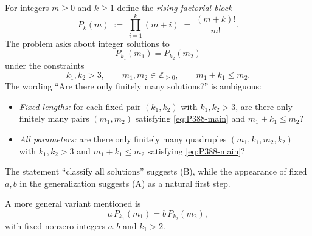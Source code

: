 For integers $m\ge 0$ and $k\ge 1$ define the \emph{rising factorial block}
\[
P_k(m) \;:=\; \prod_{i=1}^{k}(m+i) \;=\; \frac{(m+k)!}{m!}.
\]
The problem asks about integer solutions to
\begin{equation}
\label{eq:P388-main}
P_{k_1}(m_1)=P_{k_2}(m_2)
\end{equation}
under the constraints
\[
 k_1,k_2>3,\qquad m_1,m_2\in\mathbb Z_{\ge 0},\qquad m_1+k_1\le m_2.
\]
The wording ``Are there only finitely many solutions?'' is ambiguous:
\begin{itemize}[leftmargin=2em]
\item[(A)] \emph{Fixed lengths:} for each fixed pair $(k_1,k_2)$ with $k_1,k_2>3$, are there only finitely many pairs $(m_1,m_2)$ satisfying \eqref{eq:P388-main} and $m_1+k_1\le m_2$?
\item[(B)] \emph{All parameters:} are there only finitely many quadruples $(m_1,k_1,m_2,k_2)$ with $k_1,k_2>3$ and $m_1+k_1\le m_2$ satisfying \eqref{eq:P388-main}?
\end{itemize}
The statement ``classify all solutions'' suggests (B), while the appearance of fixed $a,b$ in the generalization suggests (A) as a natural first step.

A more general variant mentioned is
\begin{equation}
\label{eq:P388-ab}
 a\,P_{k_1}(m_1)=b\,P_{k_2}(m_2),
\end{equation}
with fixed nonzero integers $a,b$ and $k_1>2$.
